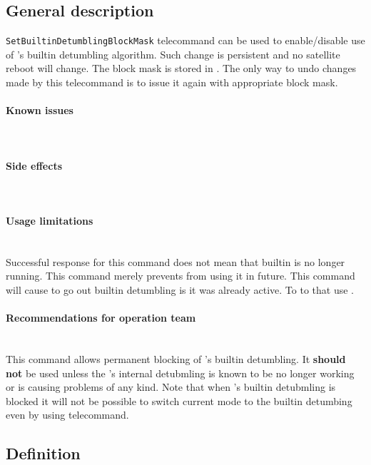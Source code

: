 
\subsection{General description}
\texttt{SetBuiltinDetumblingBlockMask} telecommand can be used to enable/disable use of 
\Imtq's builtin detumbling algorithm. Such change is persistent and no satellite reboot 
will change. The block mask is stored in . The only 
way to undo changes made by this telecommand is to issue it again with appropriate 
block mask.

\paragraph{Known issues} \mbox{} \\
\None

\paragraph{Side effects} \mbox{} \\
\None

\paragraph{Usage limitations} \mbox{} \\
Successful response for this command does not mean that builtin is no longer running. 
This command merely prevents \obc from using it in future. This command will cause \obc
to go out builtin detumbling is it was already active. To to that use .

\paragraph{Recommendations for operation team} \mbox{} \\
This command allows permanent blocking of \Imtq's builtin detumbling. It \textbf{should not} 
be used unless the \Imtq's internal detubmling is known to be no longer working or is causing
problems of any kind. 
Note that when \Imtq's builtin detubmling is blocked it will not be possible to switch 
current \Adcs mode to the builtin detumbing even by using  telecommand.

\subsection{Definition}

